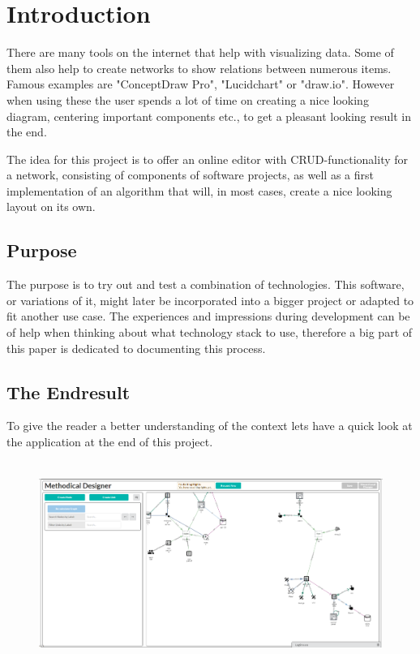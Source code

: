 \chapter{Introduction}
\label{chap:Intro}
There are many tools on the internet that help with visualizing data. Some of them also help to create networks to show relations between numerous items. Famous examples are "ConceptDraw Pro", "Lucidchart" \cite{JeffParker} or "draw.io". However when using these the user spends a lot of time on creating a nice looking diagram, centering important components etc., to get a pleasant looking result in the end.

The idea for this project is to offer an online editor with CRUD-functionality for a network, consisting of components of software projects, as well as a first implementation of an algorithm that will, in most cases, create a nice looking layout on its own.

\section{Purpose}
The purpose is to try out and test a combination of technologies. This software, or variations of it, might later be incorporated into a bigger project or adapted to fit another use case. The experiences and impressions during development can be of help when thinking about what technology stack to use, therefore a big part of this paper is dedicated to documenting this process.

\section{The Endresult}
To give the reader a better understanding of the context lets have a quick look at the application at the end of this project.
\begin{figure}[H]
\centering
\includegraphics[width=\textwidth, height=250px]{Bilder/AppOverview.png}
\label{pic:AppOverview}
\end{figure}

